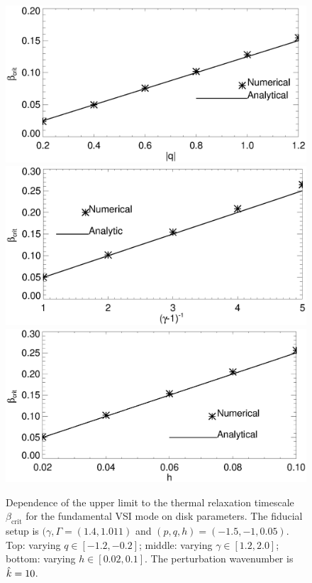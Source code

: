 \begin{figure}
  \includegraphics[width=\linewidth,clip=true,trim=0cm 0.cm 0cm
  0cm]{figures/bcrit_compare_q.ps} 
  \includegraphics[width=\linewidth,clip=true,trim=0cm 0.0cm 0cm
  0.8cm]{figures/bcrit_compare_g.ps}
  \includegraphics[width=\linewidth,clip=true,trim=0cm 0.0cm 0cm
  0.8cm]{figures/bcrit_compare_e.ps} 
  \caption{Dependence of the upper limit to the thermal relaxation timescale
    $\beta_\mathrm{crit}$ for the fundamental VSI mode on disk
    parameters. The fiducial setup is $(\gamma, \Gamma= (1.4, 1.011)$
    and $(p,q, h)=(-1.5,-1,0.05)$. Top: varying 
    $q\in[-1.2,-0.2]$; middle: varying $\gamma\in[1.2,2.0]$; bottom:
    varying $ h\in[0.02,0.1]$. The perturbation wavenumber is
    $\hat{k}=10$.  
    \label{bcrit_compare}}  
\end{figure}

